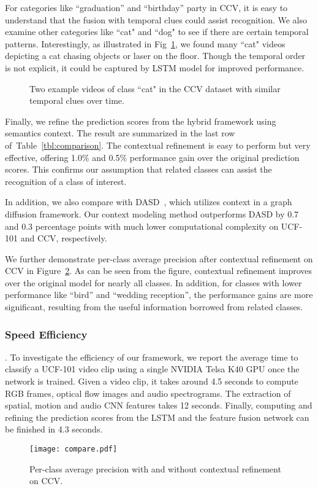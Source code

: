 \documentclass[journal]{IEEEtran}
\begin{document}
For categories like ``graduation'' and ``birthday'' party in CCV, it is easy to understand that the fusion with temporal clues could assist recognition. We also examine other categories like ``cat" and ``dog" to see if there are certain temporal patterns. Interestingly, as illustrated in Fig~\ref{fig:example}, we found many ``cat" videos depicting a cat chasing objects or laser on the floor. Though the temporal order is not explicit, it could be captured by LSTM model for improved performance.




\begin{figure}[t!]
\centering
{}
\caption{Two example videos of class ``cat" in the CCV dataset with similar temporal clues over time.}
\label{fig:example}
\end{figure}

Finally, we refine the prediction scores from the hybrid framework using semantics context. The result are summarized in the last row of~Table~\ref{tbl:comparison}. The contextual refinement is easy to perform but very effective, offering 1.0\% and 0.5\% performance gain over the original prediction scores. This confirms our assumption that related classes can assist the recognition of a class of interest.  {\color{black}In addition, we also compare with DASD~\cite{iccv09:dasd}, which utilizes context in a graph diffusion framework. Our context modeling method outperforms DASD by 0.7 and 0.3 percentage points with much lower computational complexity on UCF-101 and CCV, respectively. 

We further demonstrate per-class average precision after contextual refinement on CCV in Figure~\ref{fig:perclassCCV}. As can be seen from the figure, contextual refinement improves over the original model for nearly all classes. In addition, for classes with lower performance like ``bird'' and ``wedding reception'', the performance gains are more significant, resulting from the useful information borrowed from related classes.}


\subsubsection{Speed Efficiency}. To investigate the efficiency of our framework, we report the average time to classify a UCF-101 video clip using a single NVIDIA Telsa K40 GPU once the network is trained. Given a video clip, it takes around 4.5 seconds to compute RGB frames, optical flow images and audio spectrograms. The extraction of spatial, motion and audio CNN features takes 12 seconds. Finally, computing and refining the prediction scores from the LSTM and the feature fusion network can be finished in 4.3 seconds.
\begin{figure}[t!]
\centering
\texttt{[image: compare.pdf]}
\caption{Per-class average precision with and without contextual refinement on CCV. }
\label{fig:perclassCCV}
\end{figure}
\end{document}
